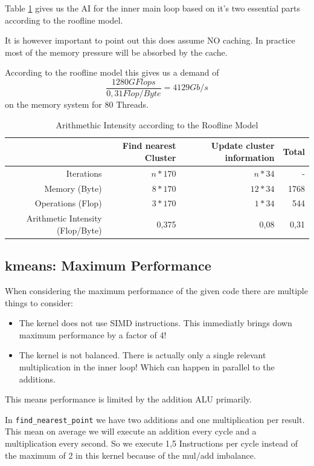 Table \ref{tab:AI} gives us the AI for the inner main loop based on it's two essential parts according to the roofline model.

It is however important to point out this does assume NO caching. In practice most of the memory pressure will be absorbed by the cache.

According to the roofline model this gives us a demand of $$\frac{1280GFlops}{0,31Flop/Byte} = 4129 Gb/s$$ on the memory system for 80 Threads.

\begin{table}[ht]
	\centering
	\caption{Arithmethic Intensity according to the Roofline Model}
	\label{tab:AI}
	\begin{tabular}{|r|r|r|r|}
		\hline
		& Find nearest Cluster & Update cluster information & Total \\ \hline
		Iterations           & $n * 170$            & $n*34$                     & -     \\ \hline
		Memory (Byte)              & $8*170$              & $12*34$                      & 1768  \\ \hline
		Operations (Flop)          & $3*170$              & $1*34$                       & 544   \\ \hline
		Arithmetic Intensity (Flop/Byte) & 0,375                & 0,08                       & 0,31  \\ \hline
	\end{tabular}
\end{table}

\subsection{kmeans: Maximum Performance}

When considering the maximum performance of the given code there are multiple things to consider:

\begin{itemize}
	\item The kernel does not use SIMD instructions. This immediatly brings down maximum performance by a factor of 4!
	\item The kernel is not balanced. There is actually only a single relevant multiplication in the inner loop! Which can happen in parallel to the additions.
\end{itemize}

This means performance is limited by the addition ALU primarily.

In \texttt{find\_nearest\_point} we have two additions and one multiplication per result. This mean on average we will execute an addition every cycle and a multiplication every second.
So we execute 1,5 Instructions per cycle instead of the maximum of 2 in this kernel because of the mul/add imbalance.


